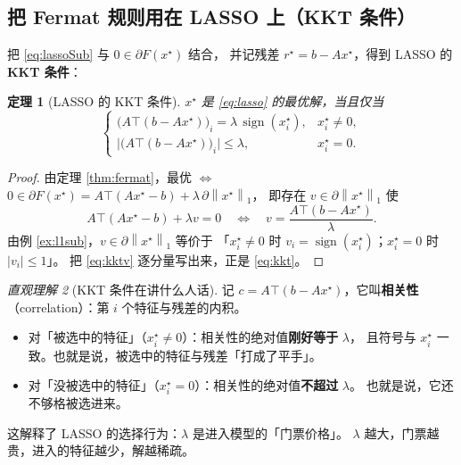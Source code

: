 \documentclass[11pt,a4paper,UTF8]{ctexart}
\theoremstyle{plain}
\newtheorem{theorem}{定理}[section]
\theoremstyle{definition}
\theoremstyle{remark}
\newtheorem{intuition}[theorem]{直观理解}
\newcommand{\norm}[1]{\left\lVert #1 \right\rVert}
\newcommand{\abs}[1]{\left\lvert #1 \right\rvert}
\DeclareMathOperator{\sign}{sign}
\begin{document}
\subsection{把 Fermat 规则用在 LASSO 上（KKT 条件）}

把 \eqref{eq:lassoSub} 与 $0\in\partial F(x^\star)$ 结合，
并记残差 $r^\star=b-Ax^\star$，得到 LASSO 的\textbf{KKT 条件}：

\begin{theorem}[LASSO 的 KKT 条件]\label{thm:kkt}
$x^\star$ 是 \eqref{eq:lasso} 的最优解，当且仅当
\begin{equation}
\begin{cases}
\bigl(A\top(b-Ax^\star)\bigr)_i=\lambda\,\sign(x_i^\star), & x_i^\star\neq0,\\[2pt]
\bigl| \bigl(A\top(b-Ax^\star)\bigr)_i \bigr|\le\lambda, & x_i^\star=0 .
\end{cases}
\label{eq:kkt}
\end{equation}
\end{theorem}

\begin{proof}
由定理 \ref{thm:fermat}，最优 $\iff$ $0\in\partial F(x^\star)
=A\top(Ax^\star-b)+\lambda\,\partial\norm{x^\star}_1$，
即存在 $v\in\partial\norm{x^\star}_1$ 使
\begin{equation}
A\top(Ax^\star-b)+\lambda v=0
\quad\Longleftrightarrow\quad
v=\frac{A\top(b-Ax^\star)}{\lambda} .
\label{eq:kktv}
\end{equation}
由例 \ref{ex:l1sub}，$v\in\partial\norm{x^\star}_1$ 等价于
「$x_i^\star\neq0$ 时 $v_i=\sign(x_i^\star)$；$x_i^\star=0$ 时 $\abs{v_i}\le1$」。
把 \eqref{eq:kktv} 逐分量写出来，正是 \eqref{eq:kkt}。
\end{proof}

\begin{intuition}[KKT 条件在讲什么人话]
记 $c=A\top(b-Ax^\star)$，它叫\textbf{相关性}（correlation）：第 $i$ 个特征与残差的内积。
\begin{itemize}
\item 对「被选中的特征」（$x_i^\star\neq0$）：相关性的绝对值\textbf{刚好等于} $\lambda$，
      且符号与 $x_i^\star$ 一致。也就是说，被选中的特征与残差「打成了平手」。
\item 对「没被选中的特征」（$x_i^\star=0$）：相关性的绝对值\textbf{不超过} $\lambda$。
      也就是说，它还不够格被选进来。
\end{itemize}
这解释了 LASSO 的选择行为：$\lambda$ 是进入模型的「门票价格」。
$\lambda$ 越大，门票越贵，进入的特征越少，解越稀疏。
\end{intuition}
\end{document}
